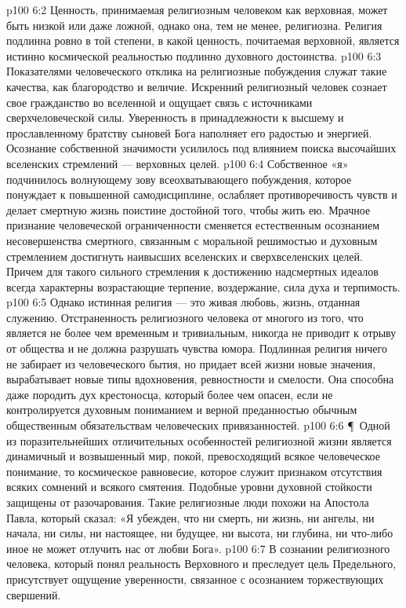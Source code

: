 \vs p100 6:2 Ценность, принимаемая религиозным человеком как верховная, может быть низкой или даже ложной, однако она, тем не менее, религиозна. Религия подлинна ровно в той степени, в какой ценность, почитаемая верховной, является истинно космической реальностью подлинно духовного достоинства.
\vs p100 6:3 Показателями человеческого отклика на религиозные побуждения служат такие качества, как благородство и величие. Искренний религиозный человек сознает свое гражданство во вселенной и ощущает связь с источниками сверхчеловеческой силы. Уверенность в принадлежности к высшему и прославленному братству сыновей Бога наполняет его радостью и энергией. Осознание собственной значимости усилилось под влиянием поиска высочайших вселенских стремлений --- верховных целей.
\vs p100 6:4 Собственное «я» подчинилось волнующему зову всеохватывающего побуждения, которое понуждает к повышенной самодисциплине, ослабляет противоречивость чувств и делает смертную жизнь поистине достойной того, чтобы жить ею. Мрачное признание человеческой ограниченности сменяется естественным осознанием несовершенства смертного, связанным с моральной решимостью и духовным стремлением достигнуть наивысших вселенских и сверхвселенских целей. Причем для такого сильного стремления к достижению надсмертных идеалов всегда характерны возрастающие терпение, воздержание, сила духа и терпимость.
\vs p100 6:5 Однако истинная религия --- это живая любовь, жизнь, отданная служению. Отстраненность религиозного человека от многого из того, что является не более чем временным и тривиальным, никогда не приводит к отрыву от общества и не должна разрушать чувства юмора. Подлинная религия ничего не забирает из человеческого бытия, но придает всей жизни новые значения, вырабатывает новые типы вдохновения, ревностности и смелости. Она способна даже породить дух крестоносца, который более чем опасен, если не контролируется духовным пониманием и верной преданностью обычным общественным обязательствам человеческих привязанностей.
\vs p100 6:6 \P\ Одной из поразительнейших отличительных особенностей религиозной жизни является динамичный и возвышенный мир, покой, превосходящий всякое человеческое понимание, то космическое равновесие, которое служит признаком отсутствия всяких сомнений и всякого смятения. Подобные уровни духовной стойкости защищены от разочарования. Такие религиозные люди похожи на Апостола Павла, который сказал: «Я убежден, что ни смерть, ни жизнь, ни ангелы, ни начала, ни силы, ни настоящее, ни будущее, ни высота, ни глубина, ни что\hyp{}либо иное не может отлучить нас от любви Бога».
\vs p100 6:7 В сознании религиозного человека, который понял реальность Верховного и преследует цель Предельного, присутствует ощущение уверенности, связанное с осознанием торжествующих свершений.

